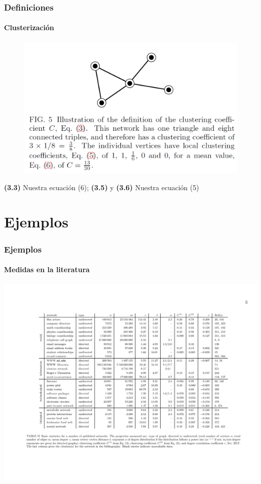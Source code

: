 \documentclass[10pt]{beamer}
\begin{document}
\begin{frame}
\frametitle{Definiciones}
\framesubtitle{Clusterizaci\'on}
\begin{figure}
\centering
\includegraphics[width=.6\linewidth]{small_net_centrality.png}
\end{figure}

{\bf (3.3)} Nuestra ecuaci\'on (6); {\bf (3.5)} y  {\bf (3.6)} Nuestra ecuaci\'on (5)

\end{frame}

\section{Ejemplos}

\begin{frame}
\frametitle{Ejemplos}
\framesubtitle{Medidas en la literatura}
\includegraphics[trim=1cm 1.5cm 1cm 1.5cm, clip=true, width=\linewidth]{the_structure_and_function_of_complex_networks_(newman_2003)_tabla_ii.pdf}
\end{frame}
\end{document}

